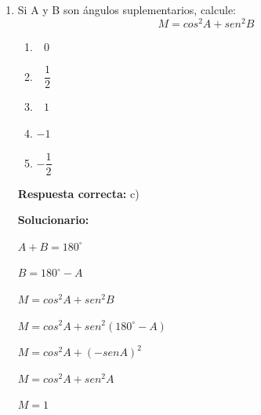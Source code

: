 \begin{enumerate}[resume]
	
	\item Si A y B son ángulos suplementarios, calcule:
	\[M=cos^2A+sen^2B\]
	\begin{enumerate}[label=\alph*)]
		\item $\,\,\,\,0$
		\item $\,\,\,\,\dfrac{1}{2}$
		\item $\,\,\,\,1$
		\item $-1$
		\item $-\dfrac{1}{2}$
	\end{enumerate}
	
	\textbf{Respuesta correcta:} c)
	
	\vspace{2mm}
	\textbf{Solucionario:}
	
	$A+B=180^\circ$
	
	$B=180^\circ-A$
	
	$M=cos^2A+sen^2B$
	
	$M=cos^2A+sen^2(180^\circ-A)$
	
	$M=cos^2A+(-senA)^2$
	
	$M=cos^2A+sen^2A$
	
	$M=1$
	
\end{enumerate}




